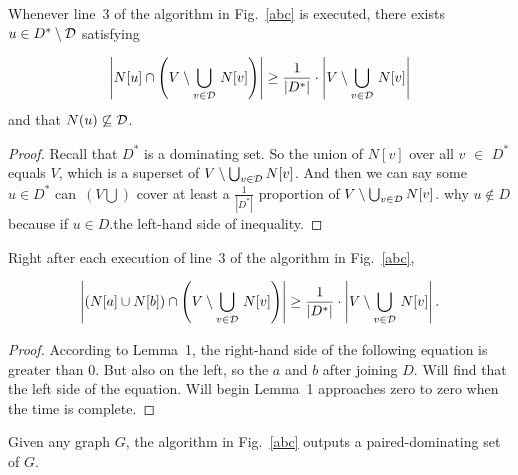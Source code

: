 \documentclass[12pt]{article}
\begin{document}
\begin{lemma}
Whenever line~3 of the algorithm in Fig.~\ref{abc} is executed,
there exists $u\in D^*\setminus {\cal D}$ satisfying

\begin{equation}
\left|N[u]\cap \left(V\setminus \bigcup_{v\in {\cal D}}\,N[v]\right)\right|
\ge \frac{1}{|D^*|}
\cdot\left|V\setminus \bigcup_{v\in {\cal D}}\,N[v]\right|
\label{lemma2-equation}
\end{equation}
and that $N(u)\not\subseteq {\cal D}$.
\end{lemma}
\begin{proof}
Recall that $D^*$ is a dominating set. So the union of $N[v]$ over all $v$ $\in$ $D^*$ equals $V$, which is a superset of $V\setminus \bigcup_{v\in{\cal D}} N[v]$. And then we can say some $u\in D^*$ can~$\left(V \bigcup \right)$ cover at least a $\frac{1}{|D^*|}$  proportion of $V\setminus \bigcup_{v\in{\cal D}} N[v]$. why $u\notin D$ because if $u\in D$.the left-hand side of inequality.




\end{proof}
\clearpage

\begin{lemma}
Right after each execution of line~3 of the algorithm in Fig.~\ref{abc},

$$
\left|\left(N[a]\cup N[b]\right)\cap \left(V\setminus \bigcup_{v\in {\cal D}}\,N[v]\right)\right|
\ge \frac{1}{|D^*|}
\cdot\left|V\setminus \bigcup_{v\in {\cal D}}\,N[v]\right|.
$$
\end{lemma}
\begin{proof}
According to Lemma~1, the right-hand side of the following equation is greater than 0. But also on the left, so the $a$ and $b$ after joining $D$. Will find that the left side of the equation. Will begin Lemma~1 approaches zero to zero when the time is complete.
\end{proof}

\begin{lemma}
Given any graph $G$, the algorithm in Fig.~\ref{abc} outputs a paired-dominating set of $G$.
\end{lemma}



\end{document}

